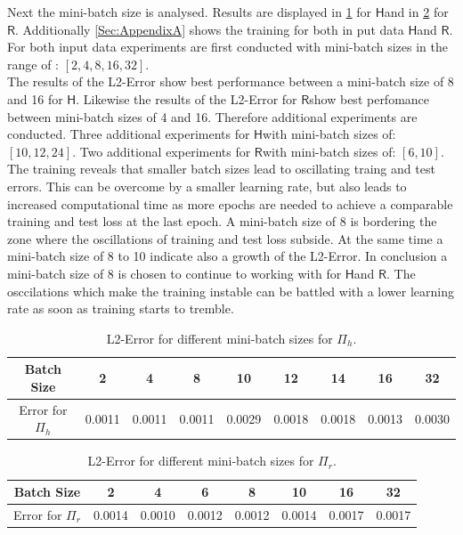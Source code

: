 \documentclass[12pt, a4paper]{article}
\newcommand{\hy}{\(\textsf{H}\)}
\newcommand{\rare}{\(\textsf{R}\)}
\begin{document}
Next the mini-batch size is analysed. Results are displayed in \cref{Tab:Batch Size Hydro} for \hy  and in \cref{Tab:Batch Size Rare} for \rare. Additionally \cref{Sec:AppendixA} shows the training for both in put data \hy and \rare. For both input data experiments are first conducted with mini-batch sizes in the range of : \([2,4,8,16,32]\).\\ The results of the L2-Error show best performance between a mini-batch size of 8 and 16 for \hy. Likewise the results of the L2-Error for \rare show best perfomance between mini-batch sizes of 4 and 16. Therefore additional experiments are conducted. Three additional experiments for \hy with mini-batch sizes of: \([10,12,24]\). Two additional experiments for \rare with mini-batch sizes of: \([6,10]\). The training reveals that smaller batch sizes lead to oscillating traing and test errors. This can be overcome by a smaller learning rate, but also leads to increased computational time as more epochs are needed to achieve a comparable training and test loss at the last epoch. A mini-batch size of 8 is bordering the zone where the oscillations of training and test loss subside. At the same time a mini-batch size of 8 to 10 indicate also a growth of the L2-Error. In conclusion a mini-batch size of 8 is chosen to continue to working with for \hy and \rare. The osccilations which make the training instable can be battled with a lower learning rate as soon as training starts to tremble.\\
\begin{table}[!htbp]\centering
	\begin{tabular}{ |c|c|c|c|c|c|c|c|c| }
		\hline
		Batch Size & 2 & 4 & 8 & 10 & 12 & 14 & 16 & 32 \\ [.5ex]
		\hline
		Error for \(\Pi_h\) & 0.0011 & 0.0011 & 0.0011 & 0.0029 & 0.0018& 0.0018 & 0.0013 & 0.0030 \\ \hline
	\end{tabular}
	\caption{L2-Error for different mini-batch sizes for \(\Pi_h\).}
	\label{Tab:Batch Size Hydro}
\end{table}
\begin{table}[!htbp]\centering
	\begin{tabular}{ |c|c|c|c|c|c|c|c| }
		\hline
		Batch Size & 2 & 4 & 6 & 8 & 10 & 16 & 32 \\ [.5ex]
		\hline
		Error for \(\Pi_r\)& 0.0014 & 0.0010 & 0.0012 & 0.0012 & 0.0014 & 0.0017 & 0.0017\\ \hline
	\end{tabular}
	\caption{L2-Error for different mini-batch sizes for \(\Pi_r\).}
	\label{Tab:Batch Size Rare}
\end{table}
\end{document}
